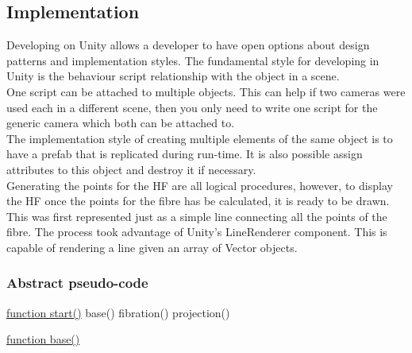 \documentclass[12pt]{article} %
\begin{document}
\begin{flushleft}
\subsection{Implementation} %
Developing on Unity allows a developer to have open options about design patterns and implementation styles. The fundamental style for developing in Unity is the behaviour script relationship with the object in a scene. \\
One script can be attached to multiple objects. This can help if two cameras were used each in a different scene, then you only need to write one script for the generic camera which both can be attached to. \\
The implementation style of creating multiple elements of the same object is to have a prefab that is replicated during run-time. It is also possible assign attributes to this object and destroy it if necessary. \\
Generating the points for the HF are all logical procedures, however, to display the HF once the points for the fibre has be calculated, it is ready to be drawn. This was first represented just as a simple line connecting all the points of the fibre. The process took advantage of Unity's LineRenderer component. This is capable of rendering a line given an array of Vector objects. 
\subsubsection{Abstract pseudo-code} %
\begin{algorithm}[H]

\underline{function start()}\;
   base()\;
   fibration()\;
   projection()\;

\underline{function base()}\;
\end{algorithm}
\end{flushleft}
\end{document}
